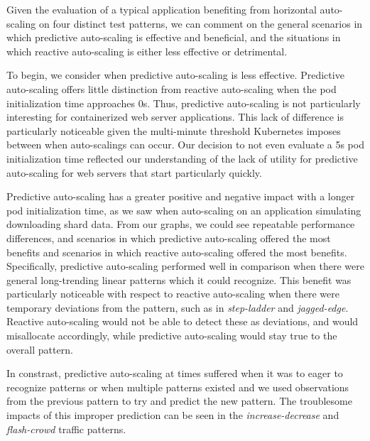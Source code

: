 Given the evaluation of a typical application benefiting from horizontal
auto-scaling on four distinct test patterns, we can comment on the general
scenarios in which predictive auto-scaling is effective and beneficial, and the
situations in which reactive auto-scaling is either less effective or
detrimental.

To begin, we consider when predictive auto-scaling is less
effective. Predictive auto-scaling offers little distinction from reactive
auto-scaling when the pod initialization time approaches 0s. Thus, predictive
auto-scaling is not particularly interesting for containerized web server
applications. This lack of difference is particularly noticeable given the
multi-minute threshold Kubernetes imposes between when auto-scalings can occur.
Our decision to not even evaluate a 5s pod initialization time reflected our
understanding of the lack of utility for predictive auto-scaling for web servers
that start particularly quickly.

Predictive auto-scaling has a greater positive and negative impact
with a longer pod initialization time, as we saw when auto-scaling on an
application simulating downloading shard data. From our graphs, we could see
repeatable performance differences, and scenarios in which predictive
auto-scaling offered the most benefits and scenarios in which reactive
auto-scaling offered the most benefits. Specifically, predictive auto-scaling
performed well in comparison when there were general long-trending linear
patterns which it could recognize. This benefit was particularly noticeable with
respect to reactive auto-scaling when there were temporary deviations from the
pattern, such as in \textit{step-ladder} and \textit{jagged-edge}. Reactive
auto-scaling would not be able to detect these as deviations, and would
misallocate accordingly, while predictive auto-scaling would stay true to the
overall pattern.

In constrast, predictive auto-scaling at times suffered when it was to eager to
recognize patterns or when multiple patterns existed and we used observations
from the previous pattern to try and predict the new pattern. The troublesome
impacts of this improper prediction can be seen in the
\textit{increase-decrease} and \textit{flash-crowd} traffic patterns.

